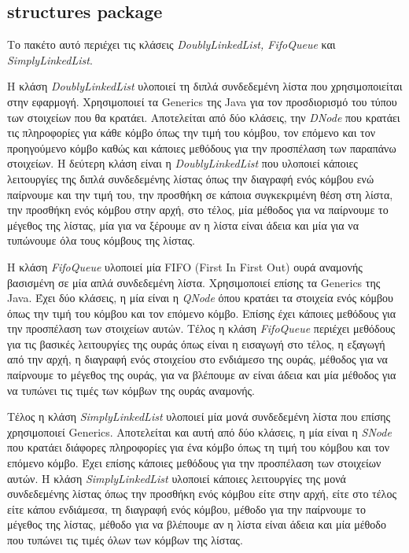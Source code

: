 \documentclass[a4paper]{article}
\begin{document}
\subsection{structures package}
Το πακέτο αυτό περιέχει τις κλάσεις \emph{DoublyLinkedList, FifoQueue} και
\emph{SimplyLinkedList}.

Η κλάση \emph{DoublyLinkedList} υλοποιεί τη διπλά συνδεδεμένη λίστα που
χρησιμοποιείται στην εφαρμογή. Χρησιμοποιεί τα Generics της Java για τον
προσδιορισμό του τύπου των στοιχείων που θα κρατάει. Αποτελείται από δύο
κλάσεις, την \emph{DNode} που κρατάει τις πληροφορίες για κάθε κόμβο όπως την
τιμή του κόμβου, τον επόμενο και τον προηγούμενο κόμβο καθώς και κάποιες
μεθόδους για την προσπέλαση των παραπάνω στοιχείων. Η δεύτερη κλάση είναι η
\emph{DoublyLinkedList} που υλοποιεί κάποιες λειτουργίες της διπλά συνδεδεμένης
λίστας όπως την διαγραφή ενός κόμβου ενώ παίρνουμε και την τιμή του, την
προσθήκη σε κάποια συγκεκριμένη θέση στη λίστα, την προσθήκη ενός κόμβου στην
αρχή, στο τέλος, μία μέθοδος για να παίρνουμε το μέγεθος της λίστας, μία για να
ξέρουμε αν η λίστα είναι άδεια και μία για να τυπώνουμε όλα τους κόμβους της
λίστας.

Η κλάση \emph{FifoQueue} υλοποιεί μία FIFO (First In First Out) ουρά αναμονής
βασισμένη σε μία απλά συνδεδεμένη λίστα. Χρησιμοποιεί επίσης τα Generics της
Java. Έχει δύο κλάσεις, η μία είναι η \emph{QNode} όπου κρατάει τα στοιχεία ενός
κόμβου όπως την τιμή του κόμβου και τον επόμενο κόμβο. Επίσης έχει κάποιες
μεθόδους για την προσπέλαση των στοιχείων αυτών. Τέλος η κλάση \emph{FifoQueue}
περιέχει μεθόδους για τις βασικές λειτουργίες της ουράς όπως είναι η εισαγωγή
στο τέλος, η εξαγωγή από την αρχή, η διαγραφή ενός στοιχείου στο ενδιάμεσο της
ουράς, μέθοδος για να παίρνουμε το μέγεθος της ουράς, για να βλέπουμε αν είναι
άδεια και μία μέθοδος για να τυπώνει τις τιμές των κόμβων της ουράς αναμονής.

Τέλος η κλάση \emph{SimplyLinkedList} υλοποιεί μία μονά συνδεδεμένη λίστα που
επίσης χρησιμοποιεί Generics. Αποτελείται και αυτή από δύο κλάσεις, η μία είναι η
\emph{SNode} που κρατάει διάφορες πληροφορίες για ένα κόμβο όπως τη τιμή του
κόμβου και τον επόμενο κόμβο. Έχει επίσης κάποιες μεθόδους για την προσπέλαση
των στοιχείων αυτών. Η κλάση \emph{SimplyLinkedList} υλοποιεί κάποιες
λειτουργίες της μονά συνδεδεμένης λίστας όπως την προσθήκη ενός κόμβου είτε στην
αρχή, είτε στο τέλος είτε κάπου ενδιάμεσα, τη διαγραφή ενός κόμβου, μέθοδο για
την παίρνουμε το μέγεθος της λίστας, μέθοδο για να βλέπουμε αν η λίστα είναι
άδεια και μία μέθοδο που τυπώνει τις τιμές όλων των κόμβων της λίστας.
\end{document}
